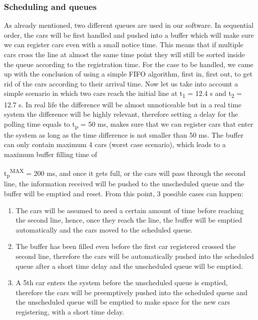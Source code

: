 \documentclass[conference]{IEEEtran}
\begin{document}
\subsubsection{Scheduling and queues}

As already mentioned, two different queues are used in our software. In sequential order, the cars will be first handled and pushed into a buffer which will make sure we can register cars even with a small notice time. This means that if multiple cars cross the line at almost the same time point they will still be sorted inside the queue according to the registration time. For the case to be handled, we came up with the conclusion of using a simple FIFO algorithm, first in, first out, to get rid of the cars according to their arrival time. Now let us take into account a simple scenario in which two cars reach the initial line at t\textsubscript{1} = 12.4 s and t\textsubscript{2} = 12.7 s. In real life the difference will be almost unnoticeable but in a real time system the difference will be highly relevant, therefore setting a delay for the polling time equals to t\textsubscript{p} = 50 ms, makes sure that we can register cars that enter the system as long as the time difference is not smaller than 50 ms. The buffer can only contain maximum 4 cars (worst case scenario), which leads to a maximum buffer filling time of

t\textsubscript{p}\textsuperscript{MAX} = 200 ms, and once it gets full, or the cars will pass through the second line, the information received will be pushed to the unscheduled queue and the buffer will be emptied and reset. From this point, 3 possible cases can happen:

\begin{enumerate}
\item The cars will be assumed to need a certain amount of time before reaching the second line, hence, once they reach the line, the buffer will be emptied automatically and the cars moved to the scheduled queue.

\item The buffer has been filled even before the first car registered crossed the second line, therefore the cars will be automatically pushed into the scheduled queue after a short time delay and the unscheduled queue will be emptied.

\item A 5th car enters the system before the unscheduled queue is emptied, therefore the cars will be preemptively pushed into the scheduled queue and the unscheduled queue will be emptied to make space for the new cars registering, with a short time delay.
\end{enumerate}
\end{document}
